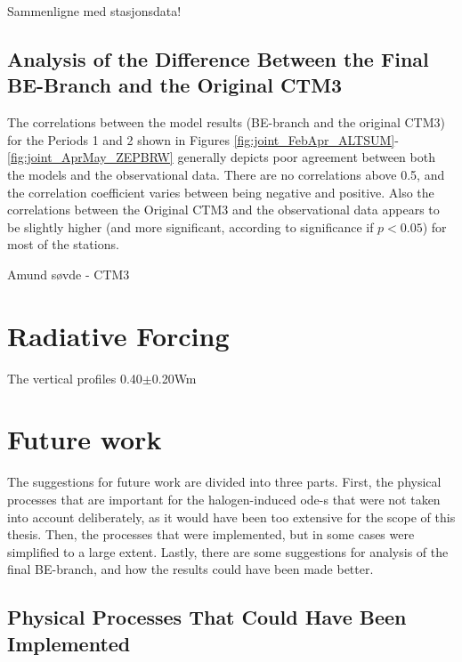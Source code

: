 Sammenligne med stasjonsdata! 

\subsection{Analysis of the Difference Between the Final BE-Branch and the Original CTM3}\label{sec:disc_origBE}

The correlations between the model results (BE-branch and the original CTM3) for the Periods 1 and 2 shown in Figures \ref{fig:joint_FebApr_ALTSUM}-\ref{fig:joint_AprMay_ZEPBRW} generally depicts poor agreement between both the models and the observational data. There are no correlations above 0.5, and the correlation coefficient varies between being negative and positive. Also the correlations between the Original CTM3 and the observational data appears to be slightly higher (and more significant, according to significance if $p<0.05$) for most of the stations. 


Amund søvde - CTM3

\section{Radiative Forcing}\label{sec:disc_RF}

The vertical profiles 
0.40$\pm$0.20Wm \cite{IPCCchapter8}

\section{Future work}

The suggestions for future work are divided into three parts. First, the physical processes that are important for the halogen-induced \acrlong{ode}-s that were not taken into account deliberately, as it would have been too extensive for the scope of this thesis. Then, the processes that were implemented, but in some cases were simplified to a large extent. Lastly, there are some suggestions for analysis of the final BE-branch, and how the results could have been made better.

\subsection{Physical Processes That Could Have Been Implemented}

